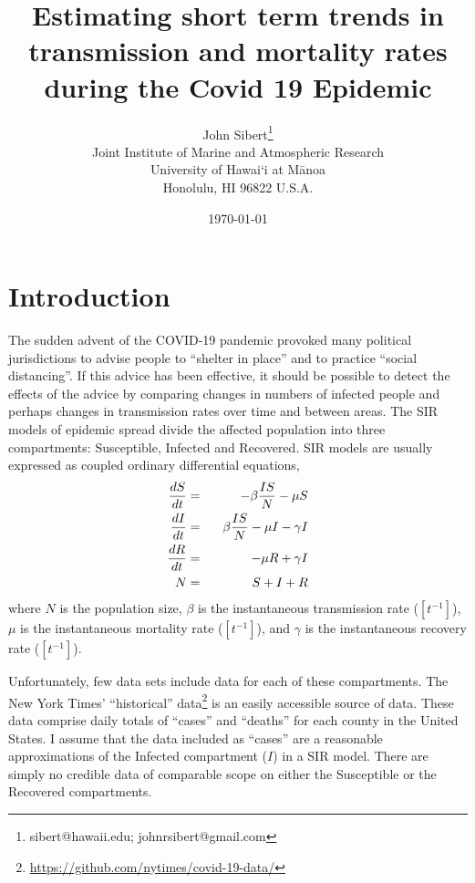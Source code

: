 \documentclass[12pt,letterpaper]{article}
\title{Estimating short term trends in transmission and mortality rates
during the Covid 19 Epidemic}
\author{
John Sibert\thanks{sibert@hawaii.edu; johnrsibert@gmail.com}\\
Joint Institute of Marine and Atmospheric Research\\
University of Hawai`i at M\={a}noa\\
Honolulu, HI  96822 U.S.A.\\[0.125in]
\date{\today}
}
\newcommand\doublespacing{\baselineskip=1.6\normalbaselineskip}
\begin{document}
\maketitle

\doublespacing

\section*{Introduction}

The sudden advent of the COVID-19 pandemic provoked many political
jurisdictions to advise people to ``shelter in place'' and to practice
``social distancing''. If this advice has been effective, it should be
possible to detect the effects of the advice by comparing changes in
numbers of infected people and perhaps changes in transmission rates
over time and
between areas. The SIR models of epidemic spread divide the affected
population into three compartments: 
Susceptible, Infected and Recovered.
SIR models are
usually expressed as coupled ordinary differential equations,
\begin{eqnarray}
\label{eqn:SIR}
\frac{dS}{dt} &=& -\beta\frac{IS}{N} - \mu S\\
\frac{dI}{dt} &=& \hphantom{-}\beta\frac{IS}{N} - \mu I -\gamma I\\
\frac{dR}{dt} &=&  -\mu R +\gamma I\\
N &=& S + I + R
\end{eqnarray}
where $N$ is the population size, $\beta$ is the instantaneous
transmission rate ($[t^{-1}]$), $\mu$ is the instantaneous mortality rate
($[t^{-1}]$),  and $\gamma$ is the instantaneous recovery rate
($[t^{-1}]$).  


Unfortunately, few data sets include data for each of
these compartments. 
The New York Times' ``historical'' 
data\footnote{\label{ff:nyt}\url{https://github.com/nytimes/covid-19-data/}}
is an easily accessible source of data. These
data comprise daily totals of ``cases'' and ``deaths'' for each county
in the United States. I assume that the data included as ``cases'' are
a reasonable approximations of the Infected compartment ($I$) in a SIR model. 
There are simply no credible data of comparable scope on either the Susceptible or
the Recovered compartments.
\end{document}
